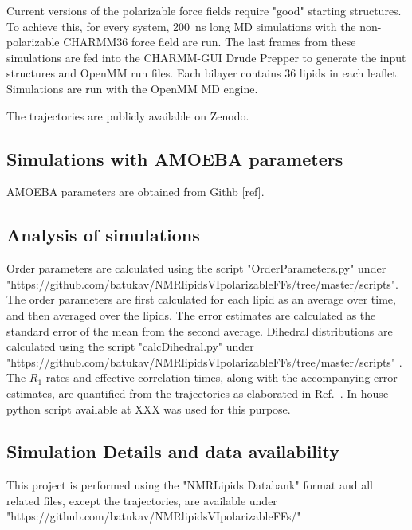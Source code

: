 \documentclass[journal=jacsat,manuscript=article,layout=singlecolumn]{achemso}
\begin{document}
Current versions of the polarizable force fields require "good" starting structures. To achieve this, for every system, 200~ns long MD simulations with the non-polarizable CHARMM36 force field are run. The last frames from these simulations are fed into the CHARMM-GUI Drude Prepper to generate the input structures and OpenMM run files. Each bilayer contains 36 lipids in each leaflet. Simulations are run with the OpenMM MD engine. 

The trajectories are publicly available on Zenodo.

\subsection{Simulations with AMOEBA parameters}


AMOEBA parameters are obtained from Githb [ref]. 

\subsection{Analysis of simulations}
Order parameters are calculated using the script "OrderParameters.py" under\\ "https://github.com/batukav/NMRlipidsVIpolarizableFFs/tree/master/scripts". \\
The order parameters are first calculated for each lipid as an average over time, and then averaged over the lipids. The error estimates are calculated as the standard error of the mean from the second average.
Dihedral distributions are calculated using the script "calcDihedral.py" under\\ "https://github.com/batukav/NMRlipidsVIpolarizableFFs/tree/master/scripts" .\\
The $R_{1}$ rates and effective correlation times, along with the accompanying error estimates, are quantified from the trajectories as elaborated in Ref.~. In-house python script available at XXX was used for this purpose.
\subsection{Simulation Details and data availability}
This project is performed using the "NMRLipids Databank" format and all related files, except the trajectories, are available under\\ "https://github.com/batukav/NMRlipidsVIpolarizableFFs/"
\end{document}
